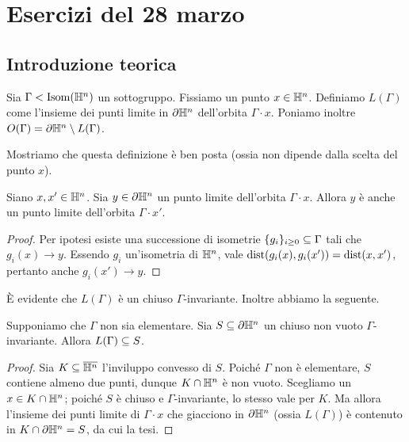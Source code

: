\section*{Esercizi del 28 marzo}
\subsection*{Introduzione teorica}
\begin{definition*}
Sia $\Gamma<\operatorname{Isom}(\mathbb{H}^n)$ un sottogruppo. Fissiamo un punto $x\in\mathbb{H}^n$. Definiamo $L(\Gamma)$ come l'insieme dei punti limite in $\partial\mathbb{H}^n$ dell'orbita $\Gamma\cdot x$. Poniamo inoltre $O(\Gamma)=\partial\mathbb{H}^n\setminus L(\Gamma)$.
\end{definition*}

Mostriamo che questa definizione è ben posta (ossia non dipende dalla scelta del punto $x$).
\begin{proposition*}
Siano $x,x'\in\mathbb{H}^n$. Sia $y\in\partial\mathbb{H}^n$ un punto limite dell'orbita $\Gamma\cdot x$. Allora $y$ è anche un punto limite dell'orbita $\Gamma\cdot x'$.
\end{proposition*}
\begin{proof}
Per ipotesi esiste una successione di isometrie $\{g_i\}_{i\ge 0}\subseteq\Gamma$ tali che $g_i(x)\to y$. Essendo $g_i$ un'isometria di $\mathbb{H}^n$, vale $\operatorname{dist}(g_i(x),g_i(x'))=\operatorname{dist}(x,x')$, pertanto anche $g_i(x')\to y$.
\end{proof}

È evidente che $L(\Gamma)$ è un chiuso $\Gamma$-invariante. Inoltre abbiamo la seguente.
\begin{proposition*}
Supponiamo che $\Gamma$ non sia elementare. Sia $S\subseteq\partial\mathbb{H}^n$ un chiuso non vuoto $\Gamma$-invariante. Allora $L(\Gamma)\subseteq S$.
\end{proposition*}
\begin{proof}
Sia $K\subseteq\overline{\mathbb{H}^n}$ l'inviluppo convesso di $S$. Poiché $\Gamma$ non è elementare, $S$ contiene almeno due punti, dunque $K\cap\mathbb{H}^n$ è non vuoto. Scegliamo un $x\in K\cap\mathbb{H}^n$; poiché $S$ è chiuso e $\Gamma$-invariante, lo stesso vale per $K$. Ma allora l'insieme dei punti limite di $\Gamma\cdot x$ che giacciono in $\partial\mathbb{H}^n$ (ossia $L(\Gamma)$) è contenuto in $K\cap\partial\mathbb{H}^n=S$, da cui la tesi.
\end{proof}

